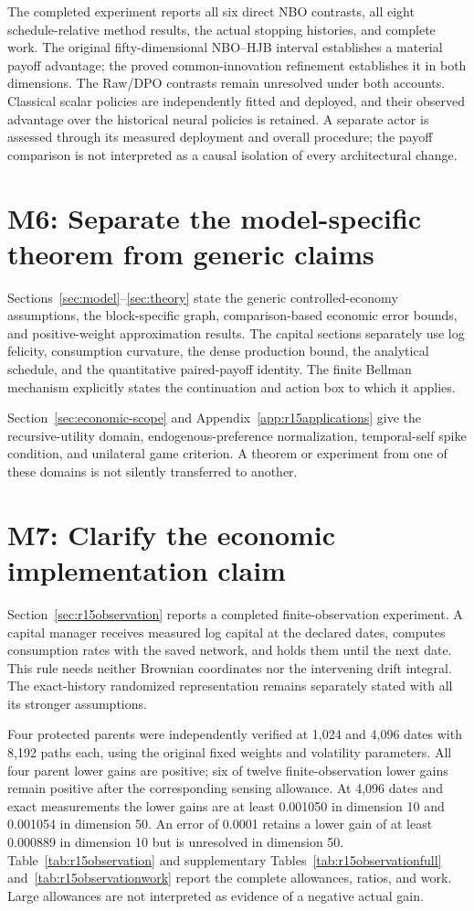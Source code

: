 The completed experiment reports all six direct NBO contrasts, all eight schedule-relative method results, the actual stopping histories, and complete work. The original fifty-dimensional NBO--HJB interval establishes a material payoff advantage; the proved common-innovation refinement establishes it in both dimensions. The Raw/DPO contrasts remain unresolved under both accounts. Classical scalar policies are independently fitted and deployed, and their observed advantage over the historical neural policies is retained. A separate actor is assessed through its measured deployment and overall procedure; the payoff comparison is not interpreted as a causal isolation of every architectural change.

\section*{M6: Separate the model-specific theorem from generic claims}
Sections~\ref{sec:model}--\ref{sec:theory} state the generic controlled-economy assumptions, the block-specific graph, comparison-based economic error bounds, and positive-weight approximation results. The capital sections separately use log felicity, consumption curvature, the dense production bound, the analytical schedule, and the quantitative paired-payoff identity. The finite Bellman mechanism explicitly states the continuation and action box to which it applies.

Section~\ref{sec:economic-scope} and Appendix~\ref{app:r15applications} give the recursive-utility domain, endogenous-preference normalization, temporal-self spike condition, and unilateral game criterion. A theorem or experiment from one of these domains is not silently transferred to another.

\section*{M7: Clarify the economic implementation claim}
Section~\ref{sec:r15observation} reports a completed finite-observation experiment. A capital manager receives measured log capital at the declared dates, computes consumption rates with the saved network, and holds them until the next date. This rule needs neither Brownian coordinates nor the intervening drift integral. The exact-history randomized representation remains separately stated with all its stronger assumptions.

Four protected parents were independently verified at 1,024 and 4,096 dates with 8,192 paths each, using the original fixed weights and volatility parameters. All four parent lower gains are positive; six of twelve finite-observation lower gains remain positive after the corresponding sensing allowance. At 4,096 dates and exact measurements the lower gains are at least 0.001050 in dimension 10 and 0.001054 in dimension 50. An error of 0.0001 retains a lower gain of at least 0.000889 in dimension 10 but is unresolved in dimension 50. Table~\ref{tab:r15observation} and supplementary Tables~\ref{tab:r15observationfull} and~\ref{tab:r15observationwork} report the complete allowances, ratios, and work. Large allowances are not interpreted as evidence of a negative actual gain.

